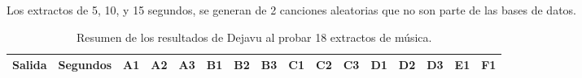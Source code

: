 \begin{sidewaystable}
\centering
\caption{Resumen de los resultados de Dejavu al probar 18 extractos de música.}{Los extractos de 5, 10, y 15 segundos, se generan de 2 canciones aleatorias que no son parte de las bases de datos.}
\label{tab:Resumen3SinCanciones}
\begin{tabular}{@{}ccc|rrrrrrrrrrrrrr@{}}
\toprule
\midrule
\multicolumn{2}{c}{Salida}                                            &  Segundos  & \multicolumn{1}{c}{A1} & \multicolumn{1}{c}{A2} & \multicolumn{1}{c}{A3} & \multicolumn{1}{c}{B1} & \multicolumn{1}{c}{B2} & \multicolumn{1}{c}{B3} & \multicolumn{1}{c}{C1} & \multicolumn{1}{c}{C2} & \multicolumn{1}{c}{C3} & \multicolumn{1}{c}{D1} & \multicolumn{1}{c}{D2} & \multicolumn{1}{c}{D3} & \multicolumn{1}{c}{E1} & \multicolumn{1}{c}{F1} \\ \midrule


\end{tabular}
\end{sidewaystable}
